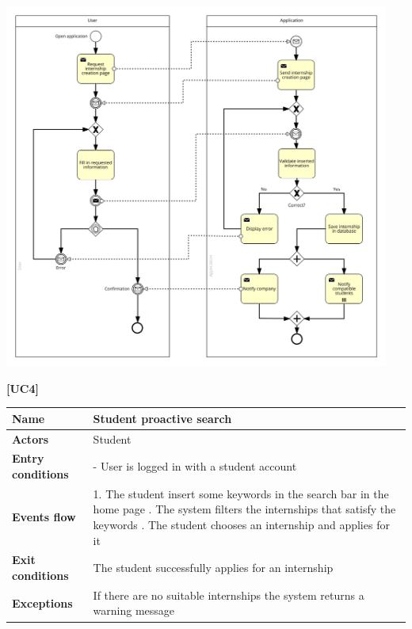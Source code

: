 \documentclass[11pt,twoside]{article}
\begin{document}
\begin{center}
\includegraphics[width=0.95\textwidth]{Images/UC3}
\end{center}

\newpage

\large{\textbf{[UC4]}}
\begin{table}[H]
\begin{tabular}{| p{} | p{} |}
\hline
\textbf{Name}
& Student proactive search \\
\hline
\textbf{Actors}
& Student \\
\hline
\textbf{Entry conditions}
& - User is logged in with a student account \\
\hline
\textbf{Events flow}
& 1. The student insert some keywords in the search bar in the home page \newline
2. The system filters the internships that satisfy the keywords \newline
3. The student chooses an internship and applies for it \\
\hline
\textbf{Exit conditions}
& The student successfully applies for an internship \\
\hline
\textbf{Exceptions}
& If there are no suitable internships the system returns a warning message \\
\hline
\end{tabular}
\end{table}
\end{document}

